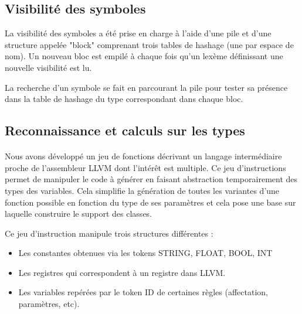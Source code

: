 \documentclass[12pt]{article}
\begin{document}
\subsection{Visibilité des symboles}

La visibilité des symboles a été prise en charge à l'aide d'une pile et d'une
structure appelée "block" comprenant trois tables de hashage (une par espace
de nom). Un nouveau bloc est empilé à chaque fois qu'un lexème définissant une
nouvelle visibilité est lu.

La recherche d'un symbole se fait en parcourant la pile pour
tester sa présence dans la table de hashage du type correspondant dans chaque
bloc.

\subsection{Reconnaissance et calculs sur les types}

\paragraph{} Nous avons développé un jeu de fonctions décrivant un langage intermédiaire
proche de l'assembleur LLVM dont l'intérêt est multiple. Ce jeu d'instructions
permet de manipuler le code à générer en faisant abstraction temporairement
des types des variables. Cela simplifie la génération de toutes les variantes
d'une fonction possible en fonction du type de ses paramètres et cela pose une
base sur laquelle construire le support des classes.

Ce jeu d'instruction manipule trois structures différentes :
\begin{itemize}
	\item Les constantes obtenues via les tokens STRING, FLOAT, BOOL, INT
	\item Les registres qui correspondent à un registre dans LLVM.
	\item Les variables repérées par le token ID de certaines règles (affectation, paramètres, etc).
\end{itemize}
\end{document}
